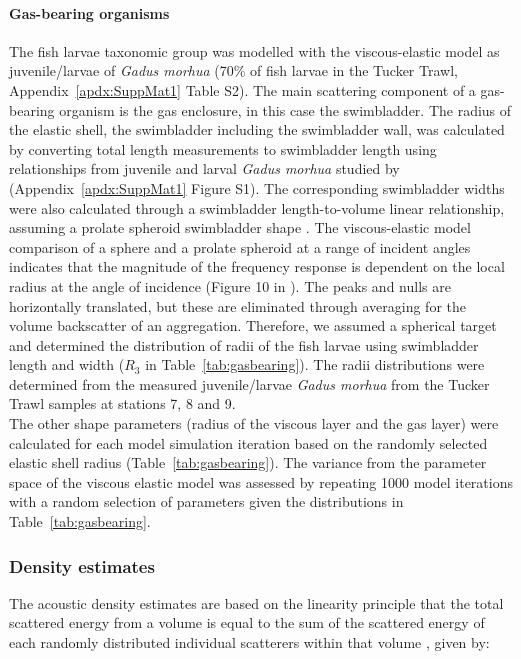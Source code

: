\paragraph{Gas-bearing organisms} 
The fish larvae taxonomic group was modelled with the viscous-elastic model as juvenile/larvae of \textit{Gadus morhua} (70\% of fish larvae in the Tucker Trawl, Appendix~\ref{apdx:SuppMat1} Table S2). The main scattering component of a gas-bearing organism is the gas enclosure, in this case the swimbladder. The radius of the elastic shell, the swimbladder including the swimbladder wall, was calculated by converting total length measurements to swimbladder length using relationships from juvenile and larval \textit{Gadus morhua} studied by \citet{Chu2003} (Appendix~\ref{apdx:SuppMat1} Figure S1). The corresponding swimbladder widths were also calculated through a swimbladder length-to-volume linear relationship, assuming a prolate spheroid swimbladder shape \citep{Chu2003}. The viscous-elastic model comparison of a sphere and a prolate spheroid at a range of incident angles indicates that the magnitude of the frequency response is dependent on the local radius at the angle of incidence (Figure 10 in \citealt{Khodabandeloo2021}). The peaks and nulls are horizontally translated, but these are eliminated through averaging for the volume backscatter of an aggregation. Therefore, we assumed a spherical target and determined the distribution of radii of the fish larvae using swimbladder length and width ($R_3$ in Table~\ref{tab:gasbearing}). The radii distributions were determined from the measured juvenile/larvae \textit{Gadus morhua} from the Tucker Trawl samples at stations 7, 8 and 9. \\
The other shape parameters (radius of the viscous layer and the gas layer) were calculated for each model simulation iteration based on the randomly selected elastic shell radius (Table~\ref{tab:gasbearing}). The variance from the parameter space of the viscous elastic model was assessed by repeating 1000 model iterations with a random selection of parameters given the distributions in Table~\ref{tab:gasbearing}.

\subsubsection{Density estimates}
The acoustic density estimates are based on the linearity principle that the total scattered energy from a volume is equal to the sum of the scattered energy of each randomly distributed individual scatterers within that volume \citep{Foote1983, Greenlaw1979, Lavery2007}, given by:

